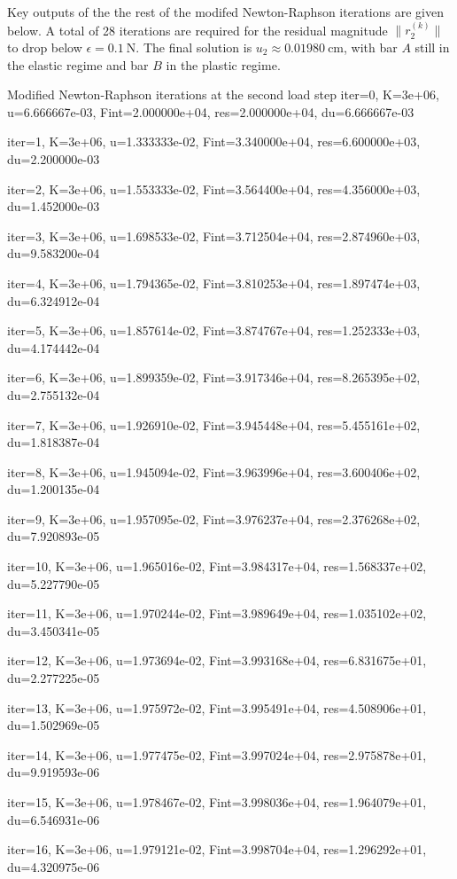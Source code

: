 Key outputs of the the rest of the modifed Newton-Raphson iterations are given below. A total of 28 iterations are required for the residual magnitude $\| r_2^{(k)}\|$ to drop below $\epsilon = \qty{0.1}{\newton}$.
The final solution is $u_2 \approx \qty{0.01980}{\centi\meter}$, with bar $A$ still in the elastic regime and bar $B$ in the plastic regime. 

\begin{codenv}{Modified Newton-Raphson iterations at the second load step}
\indent iter=0, K=3e+06, u=6.666667e-03, Fint=2.000000e+04, res=2.000000e+04, du=6.666667e-03

iter=1, K=3e+06, u=1.333333e-02, Fint=3.340000e+04, res=6.600000e+03, du=2.200000e-03

iter=2, K=3e+06, u=1.553333e-02, Fint=3.564400e+04, res=4.356000e+03, du=1.452000e-03

iter=3, K=3e+06, u=1.698533e-02, Fint=3.712504e+04, res=2.874960e+03, du=9.583200e-04

iter=4, K=3e+06, u=1.794365e-02, Fint=3.810253e+04, res=1.897474e+03, du=6.324912e-04

iter=5, K=3e+06, u=1.857614e-02, Fint=3.874767e+04, res=1.252333e+03, du=4.174442e-04

iter=6, K=3e+06, u=1.899359e-02, Fint=3.917346e+04, res=8.265395e+02, du=2.755132e-04

iter=7, K=3e+06, u=1.926910e-02, Fint=3.945448e+04, res=5.455161e+02, du=1.818387e-04

iter=8, K=3e+06, u=1.945094e-02, Fint=3.963996e+04, res=3.600406e+02, du=1.200135e-04

iter=9, K=3e+06, u=1.957095e-02, Fint=3.976237e+04, res=2.376268e+02, du=7.920893e-05

iter=10, K=3e+06, u=1.965016e-02, Fint=3.984317e+04, res=1.568337e+02, du=5.227790e-05

iter=11, K=3e+06, u=1.970244e-02, Fint=3.989649e+04, res=1.035102e+02, du=3.450341e-05

iter=12, K=3e+06, u=1.973694e-02, Fint=3.993168e+04, res=6.831675e+01, du=2.277225e-05

iter=13, K=3e+06, u=1.975972e-02, Fint=3.995491e+04, res=4.508906e+01, du=1.502969e-05

iter=14, K=3e+06, u=1.977475e-02, Fint=3.997024e+04, res=2.975878e+01, du=9.919593e-06

iter=15, K=3e+06, u=1.978467e-02, Fint=3.998036e+04, res=1.964079e+01, du=6.546931e-06

iter=16, K=3e+06, u=1.979121e-02, Fint=3.998704e+04, res=1.296292e+01, du=4.320975e-06


\end{codenv}
